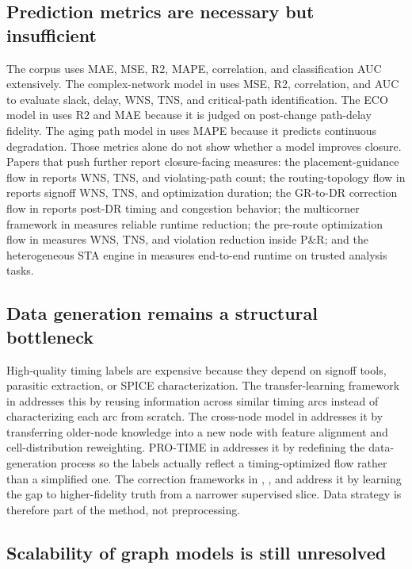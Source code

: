 \documentclass[num-refs]{wiley-article}
\begin{document}
  \subsection{Prediction metrics are necessary but insufficient}

  The corpus uses MAE, MSE, R2, MAPE, correlation, and classification AUC extensively. The complex-network model in \cite{ref2} uses MSE, R2, correlation, and AUC to evaluate slack, delay, WNS, TNS, and critical-path identification. The ECO model in \cite{ref19} uses R2 and MAE because it is judged on post-change path-delay fidelity. The aging path model in \cite{ref15} uses MAPE because it predicts continuous degradation. Those metrics alone do not show whether a model improves closure. Papers that push further report closure-facing measures: the placement-guidance flow in \cite{ref1} reports WNS, TNS, and violating-path count; the routing-topology flow in \cite{ref7} reports signoff WNS, TNS, and optimization duration; the GR-to-DR correction flow in \cite{ref10} reports post-DR timing and congestion behavior; the multicorner framework in \cite{ref16} measures reliable runtime reduction; the pre-route optimization flow in \cite{ref17} measures WNS, TNS, and violation reduction inside P\&R; and the heterogeneous STA engine in \cite{ref22} measures end-to-end runtime on trusted analysis tasks.


  \subsection{Data generation remains a structural bottleneck}

  High-quality timing labels are expensive because they depend on signoff tools, parasitic extraction, or SPICE characterization. The transfer-learning framework in \cite{ref4} addresses this by reusing information across similar timing arcs instead of characterizing each arc from scratch. The cross-node model in \cite{ref6} addresses it by transferring older-node knowledge into a new node with feature alignment and cell-distribution reweighting. PRO-TIME in \cite{ref8} addresses it by redefining the data-generation process so the labels actually reflect a timing-optimized flow rather than a simplified one. The correction frameworks in \cite{ref10}, \cite{ref13}, and \cite{ref25} address it by learning the gap to higher-fidelity truth from a narrower supervised slice. Data strategy is therefore part of the method, not preprocessing.


  \subsection{Scalability of graph models is still unresolved}
\end{document}
